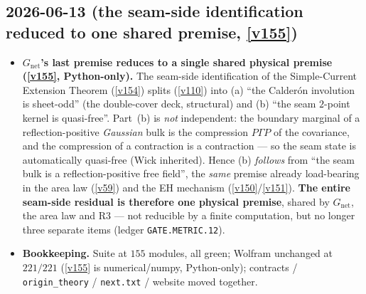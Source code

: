 \subsection*{2026-06-13 (the seam-side identification reduced to one shared premise, \vref{v155})}
\begin{itemize}
\item \textbf{$G_{\mathrm{net}}$'s last premise reduces to a single shared physical premise
  (\vref{v155}, Python-only).} The seam-side identification of the Simple-Current Extension Theorem
  (\vref{v154}) splits (\vref{v110}) into (a) ``the Calder\'on involution is sheet-odd'' (the
  double-cover deck, structural) and (b) ``the seam $2$-point kernel is quasi-free''. Part~(b) is
  \emph{not} independent: the boundary marginal of a reflection-positive \emph{Gaussian} bulk is the
  compression $P\Gamma P$ of the covariance, and the compression of a contraction is a contraction ---
  so the seam state is automatically quasi-free (Wick inherited). Hence (b) \emph{follows} from ``the
  seam bulk is a reflection-positive free field'', the \emph{same} premise already load-bearing in the
  area law (\vref{v59}) and the EH mechanism (\vref{v150}/\vref{v151}). \textbf{The entire seam-side
  residual is therefore one physical premise}, shared by $G_{\mathrm{net}}$, the area law and R3 ---
  not reducible by a finite computation, but no longer three separate items (ledger
  \texttt{GATE.METRIC.12}).
\item \textbf{Bookkeeping.} Suite at $155$ modules, all green; Wolfram unchanged at $221/221$
  (\vref{v155} is numerical/numpy, Python-only); contracts / \texttt{origin\_theory} /
  \texttt{next.txt} / website moved together.
\end{itemize}

